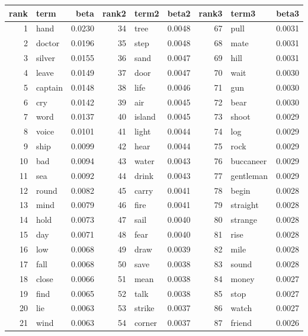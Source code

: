 \begin{table}[ht]
\centering
\begin{tabular}{rlrrlrrlr}
  \hline
rank & term & beta & rank2 & term2 & beta2 & rank3 & term3 & beta3 \\ 
  \hline
1 & hand & 0.0230 & 34 & tree & 0.0048 & 67 & pull & 0.0031 \\ 
  2 & doctor & 0.0196 & 35 & step & 0.0048 & 68 & mate & 0.0031 \\ 
  3 & silver & 0.0155 & 36 & sand & 0.0047 & 69 & hill & 0.0031 \\ 
  4 & leave & 0.0149 & 37 & door & 0.0047 & 70 & wait & 0.0030 \\ 
  5 & captain & 0.0148 & 38 & life & 0.0046 & 71 & gun & 0.0030 \\ 
  6 & cry & 0.0142 & 39 & air & 0.0045 & 72 & bear & 0.0030 \\ 
  7 & word & 0.0137 & 40 & island & 0.0045 & 73 & shoot & 0.0029 \\ 
  8 & voice & 0.0101 & 41 & light & 0.0044 & 74 & log & 0.0029 \\ 
  9 & ship & 0.0099 & 42 & hear & 0.0044 & 75 & rock & 0.0029 \\ 
  10 & bad & 0.0094 & 43 & water & 0.0043 & 76 & buccaneer & 0.0029 \\ 
  11 & sea & 0.0092 & 44 & drink & 0.0043 & 77 & gentleman & 0.0029 \\ 
  12 & round & 0.0082 & 45 & carry & 0.0041 & 78 & begin & 0.0028 \\ 
  13 & mind & 0.0079 & 46 & fire & 0.0041 & 79 & straight & 0.0028 \\ 
  14 & hold & 0.0073 & 47 & sail & 0.0040 & 80 & strange & 0.0028 \\ 
  15 & day & 0.0071 & 48 & fear & 0.0040 & 81 & rise & 0.0028 \\ 
  16 & low & 0.0068 & 49 & draw & 0.0039 & 82 & mile & 0.0028 \\ 
  17 & fall & 0.0068 & 50 & save & 0.0038 & 83 & sound & 0.0028 \\ 
  18 & close & 0.0066 & 51 & mean & 0.0038 & 84 & money & 0.0027 \\ 
  19 & find & 0.0065 & 52 & talk & 0.0038 & 85 & stop & 0.0027 \\ 
  20 & lie & 0.0063 & 53 & strike & 0.0037 & 86 & watch & 0.0027 \\ 
  21 & wind & 0.0063 & 54 & corner & 0.0037 & 87 & friend & 0.0026 \\ 

\end{tabular}
\end{table}
